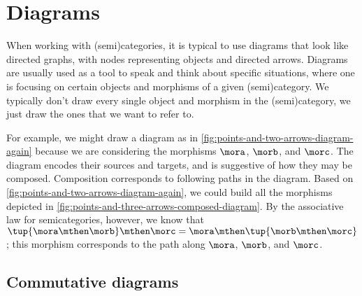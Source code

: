 
\section{Diagrams}

When working with (semi)categories, it is typical to use diagrams that look like directed graphs, with nodes representing objects and directed arrows.
Diagrams are usually used as a tool to speak and think about specific situations, where one is focusing on certain objects and morphisms of a given (semi)category. 
We typically don't draw every single object and morphism in the (semi)category, we just draw the ones that we want to refer to.

\begin{marginfigure}
    \begin{center}
    \end{center}
    \caption{}
    \label{fig:points-and-three-arrows-diagram}
\end{marginfigure}

\begin{marginfigure}
    \begin{center}
    \end{center}
    \caption{}
    \label{fig:points-and-three-arrows-composed-diagram}
\end{marginfigure}

For example, we might draw a diagram as in \cref{fig:points-and-two-arrows-diagram-again} because we are considering the morphisms $\mora$, $\morb$, and $\morc$.
The diagram encodes their sources and targets, and is suggestive of how they may be composed. Composition corresponds to following paths in the diagram. Based on \cref{fig:points-and-two-arrows-diagram-again}, we could build all the morphisms depicted in \cref{fig:points-and-three-arrows-composed-diagram}. By the associative law for semicategories, however, we know that $\tup{\mora \mthen \morb} \mthen \morc = \mora \mthen \tup{\morb \mthen \morc}$; this morphism corresponds to the path along $\mora$, $\morb$, and $\morc$. 



\subsection{Commutative diagrams}


